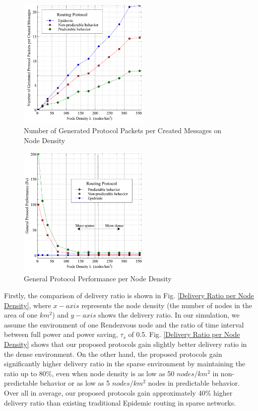 \begin{figure}[!t]
	\centering
	\includegraphics[width=2.5in]{Graphs/messages.pdf}
	\caption{Number of Generated Protocol Packets per Created Messages on Node Density}
	\label{Number of Generated Protocol Packets}
\end{figure}

\begin{figure}[!t]
\centering
\includegraphics[width=2.5in]{Graphs/ProtocolPerformance.pdf}
\caption{General Protocol Performance per Node Density}
\label{General Protocol Performance per Node Density}
\end{figure}

Firstly, the comparison of delivery ratio is shown in Fig. \ref{Delivery Ratio per Node Density}, where $x-axis$ represents the node density (the number of nodes in the area of one $km^2$) and $y-axis$ shows the delivery ratio.
In our simulation, we assume the environment of one Rendezvous node and the ratio of time interval between full power and power saving, $\tau_s$ of 0.5.
%
Fig. \ref{Delivery Ratio per Node Density} shows that our proposed protocols gain slightly better delivery ratio in the dense environment.
On the other hand, the proposed protocols gain significantly higher delivery ratio in the sparse environment by maintaining the ratio up to 80\%, even when node density is as low as 50 $nodes/km^2$ in non-predictable behavior or as low as 5 $nodes/km^2$ nodes in predictable behavior.
Over all in average, our proposed protocols gain approximately 40\% higher delivery ratio than existing traditional Epidemic routing in sparse networks.

